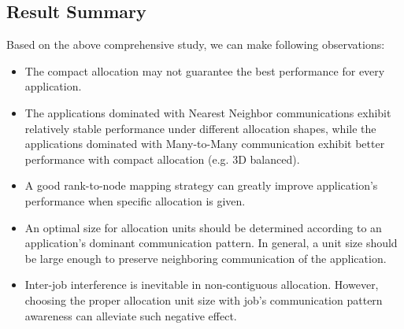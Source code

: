 \subsection{Result Summary}
\label{sec:summary}

Based on the above comprehensive study, we can make following observations:
\begin{itemize}
    \item The compact allocation may not guarantee the best performance for every application. 
    \item The applications dominated with Nearest Neighbor communications exhibit relatively stable performance under different allocation shapes, while the applications dominated with Many-to-Many communication exhibit better performance with compact allocation (e.g. 3D balanced).
    \item A good rank-to-node mapping strategy can greatly improve application's performance when specific allocation is given.
    \item An optimal size for allocation units should be determined according to an application's dominant communication pattern. In general, a unit size should be large enough to preserve neighboring communication of the application. 
    \item Inter-job interference is inevitable in non-contiguous allocation. However, choosing the proper allocation unit size with job's communication pattern awareness can alleviate such negative effect. 
\end{itemize}





